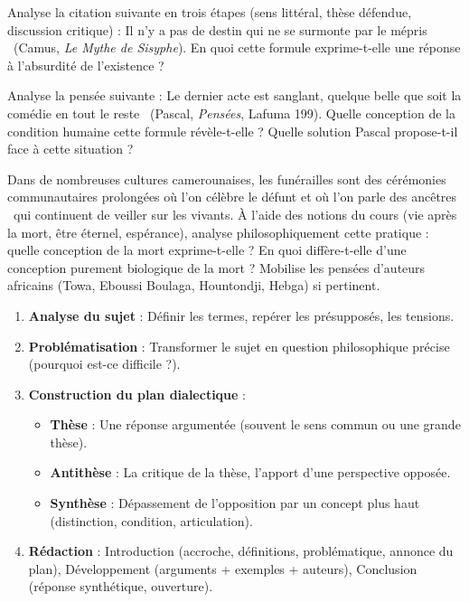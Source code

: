 \documentclass[11pt]{article}
\newcounter{popsec}
\newcounter{popsub}
\newcommand{\courssub}[1]{%
  \stepcounter{popsub}%
  \par\vspace{9pt}\noindent{\popxbold\fontsize{11.5}{13}\selectfont\color{popink}{\color{poporange}\thepopsec.\thepopsub}\hspace{6pt}#1}\par\nopagebreak\vspace{4pt}
}
\begin{document}
\begin{exercice}
Analyse la citation suivante en trois étapes (sens littéral, thèse défendue, discussion critique) : \guillemotleft Il n'y a pas de destin qui ne se surmonte par le mépris \guillemotright\ (Camus, \emph{Le Mythe de Sisyphe}). En quoi cette formule exprime-t-elle une réponse à l'absurdité de l'existence ?
\end{exercice}

\begin{exercice}
Analyse la pensée suivante : \guillemotleft Le dernier acte est sanglant, quelque belle que soit la comédie en tout le reste \guillemotright\ (Pascal, \emph{Pensées}, Lafuma 199). Quelle conception de la condition humaine cette formule révèle-t-elle ? Quelle solution Pascal propose-t-il face à cette situation ?
\end{exercice}

\begin{exercice}
Dans de nombreuses cultures camerounaises, les funérailles sont des cérémonies communautaires prolongées où l'on célèbre le défunt et où l'on parle des \guillemotleft ancêtres \guillemotright\ qui continuent de veiller sur les vivants. À l'aide des notions du cours (vie après la mort, être éternel, espérance), analyse philosophiquement cette pratique : quelle conception de la mort exprime-t-elle ? En quoi diffère-t-elle d'une conception purement biologique de la mort ? Mobilise les pensées d'auteurs africains (Towa, Eboussi Boulaga, Hountondji, Hebga) si pertinent.
\end{exercice}

\courssub{Je me prépare au Bac}

\begin{methode}
\begin{enumerate}
\item \textbf{Analyse du sujet} : Définir les termes, repérer les présupposés, les tensions.
\item \textbf{Problématisation} : Transformer le sujet en question philosophique précise (pourquoi est-ce difficile ?).
\item \textbf{Construction du plan dialectique} :
    \begin{itemize}
    \item \textbf{Thèse} : Une réponse argumentée (souvent le sens commun ou une grande thèse).
    \item \textbf{Antithèse} : La critique de la thèse, l'apport d'une perspective opposée.
    \item \textbf{Synthèse} : Dépassement de l'opposition par un concept plus haut (distinction, condition, articulation).
    \end{itemize}
\item \textbf{Rédaction} : Introduction (accroche, définitions, problématique, annonce du plan), Développement (arguments + exemples + auteurs), Conclusion (réponse synthétique, ouverture).
\end{enumerate}
\end{methode}
\end{document}
